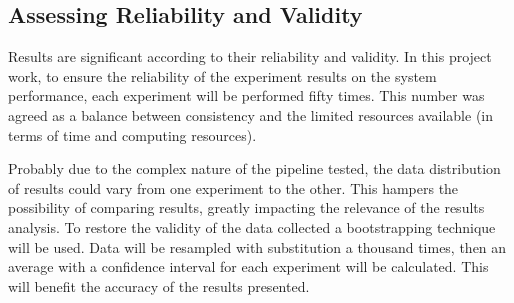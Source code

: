 \subsection{Assessing Reliability and Validity}
\label{subsec:reliability_validity}

Results are significant according to their reliability and validity. In this project work, to ensure the reliability of the experiment results on the system performance, each experiment will be performed fifty times. This number was agreed as a balance between consistency and the limited resources available (in terms of time and computing resources).

Probably due to the complex nature of the pipeline tested, the data distribution of results could vary from one experiment to the other. This hampers the possibility of comparing results, greatly impacting the relevance of the results analysis. To restore the validity of the data collected a bootstrapping technique will be used. Data will be resampled with substitution a thousand times, then an average with a confidence interval for each experiment will be calculated. This will benefit the accuracy of the results presented.
